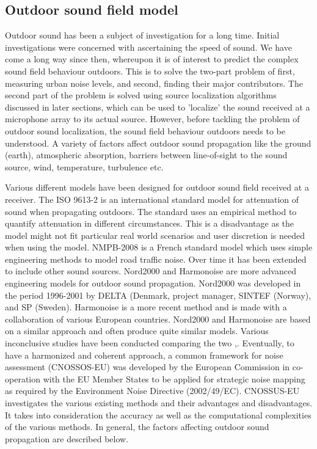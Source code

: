 \subsection{Outdoor sound field model}
Outdoor sound has been a subject of investigation for a long time. Initial investigations were concerned with ascertaining the speed of sound. We have come a long way since then, whereupon it is of interest to predict the complex sound field behaviour outdoors. This is to solve the two-part problem of first, measuring urban noise levels, and second, finding their major contributors. The second part of the problem is solved using source localization algorithms discussed in later sections, which can be used to 'localize' the sound received at a microphone array to its actual source. However, before tackling the problem of outdoor sound localization, the sound field behaviour outdoors needs to be understood. A variety of factors affect outdoor sound propagation like the ground (earth), atmospheric absorption, barriers between line-of-sight to the sound source, wind, temperature, turbulence etc.

Various different models have been designed for outdoor sound field received at a receiver. The ISO 9613-2 \cite{ISO9613} is an international standard model for attenuation of sound when propagating outdoors. The standard uses an empirical method to quantify attenuation in different circumstances. This is a disadvantage as the model might not fit particular real world scenarios and user discretion is needed when using the model. NMPB-2008 \cite{dutilleux2010nmpb} is a French standard model which uses simple engineering methods to model road traffic noise. Over time it has been extended to include other sound sources. Nord2000 \cite{plovsing2000nord2000} and Harmonoise \cite{defrance2007outdoor} are more advanced engineering models for outdoor sound propagation. Nord2000 was developed in the period 1996-2001 by DELTA (Denmark, project manager, SINTEF (Norway), and SP (Sweden). Harmonoise is a more recent method and is made with a collaboration of various European countries. Nord2000 and Harmonoise are based on a similar approach and often produce quite similar models. Various inconclusive studies have been conducted comparing the two \cite{garg2014critical},\cite{jonsson2008comparison}. Eventually, to have a harmonized and coherent approach, a common framework for noise assessment (CNOSSOS-EU) was developed by the European Commission \cite{kephalopoulos2012common} in co-operation with the EU Member States to be applied for strategic noise mapping as required by the Environment Noise Directive (2002/49/EC). CNOSSUS-EU investigates the various existing methods and their advantages and disadvantages. It takes into consideration the accuracy as well as the computational complexities of the various methods. 
In general, the factors affecting outdoor sound propagation are described below.

